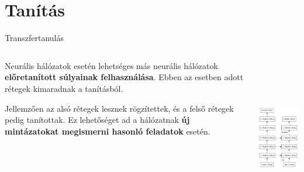 \documentclass[english, aspectratio=169]{beamer}
\makeatletter
\let\origtableofcontents=\tableofcontents
\def\tableofcontents{\@ifnextchar[{\origtableofcontents}{\gobbletableofcontents}}
\def\gobbletableofcontents#1{\origtableofcontents}
\makeatother
\begin{document}
\section{Tanítás}

\begin{frame}
	\tableofcontents[currentsection]
\end{frame}

\begin{frame}{Transzfertanulás}
	\begin{columns}
		\begin{column}{.5\textwidth}
			Neurális hálózatok esetén lehetséges más neurális hálózatok \textbf{előretanított súlyainak felhasználása}. Ebben az esetben adott rétegek kimaradnak a tanításból.\par\smallskip
			Jellemzően az alsó rétegek lesznek rögzítettek, és a felső rétegek pedig tanítottak. Ez lehetőséget ad a hálózatnak \textbf{új mintázatokat megismerni hasonló feladatok} esetén.
		\end{column}
		\begin{column}{.5\textwidth}
			\begin{center}
				\includegraphics[height=7cm, keepaspectratio]{graphs/dl_3.png}
			\end{center}
		\end{column}
	\end{columns}
\end{frame}
\end{document}
